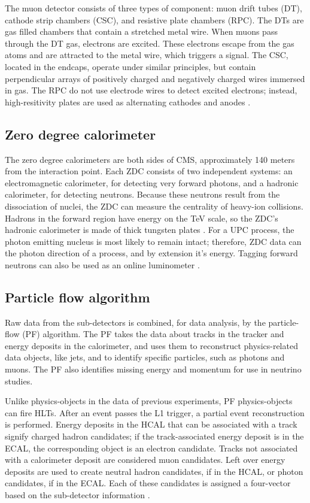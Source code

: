 The muon detector consists of three types of component: muon drift tubes (DT), cathode strip chambers (CSC), and resistive plate chambers (RPC). The DTs are gas filled chambers that contain a stretched metal wire. When muons pass through the DT gas, electrons are excited. These electrons escape from the gas atoms and are attracted to the metal wire, which triggers a signal. The CSC, located in the endcaps, operate under similar principles, but contain perpendicular arrays of positively charged and negatively charged wires immersed in gas. The RPC do not use electrode wires to detect excited electrons; instead, high-resitivity plates are used as alternating cathodes and anodes \cite{Albajar:2005wv}.

\subsection{Zero degree calorimeter}

The zero degree calorimeters are both sides of CMS, approximately 140 meters from the interaction point. Each ZDC consists of two independent systems: an electromagnetic calorimeter, for detecting very forward photons, and a hadronic calorimeter, for detecting neutrons. Because these neutrons result from the dissociation of nuclei, the ZDC can measure the centrality of heavy-ion collisions. Hadrons in the forward region have energy on the TeV scale, so the ZDC's hadronic calorimeter is made of thick tungsten plates \cite{Grachov:2006ke}. For a UPC process, the photon emitting nucleus is most likely to remain intact; therefore, ZDC data can the photon direction of a process, and by extension it's energy. Tagging forward neutrons can also be used as an online luminometer \cite{emPCite3}.

\subsection{Particle flow algorithm}

Raw data from the sub-detectors is combined, for data analysis, by the particle-flow (PF) algorithm. The PF takes the data about tracks in the tracker and energy deposits in the calorimeter, and uses them to reconstruct physics-related data objects, like jets, and to identify specific particles, such as photons and muons. The PF also identifies missing energy and momentum for use in neutrino studies. 

Unlike physics-objects in the data of previous experiments, PF physics-objects can fire HLTs. After an event passes the L1 trigger, a partial event reconstruction is performed. Energy deposits in the HCAL that can be associated with a track signify charged hadron candidates; if the track-associated energy deposit is in the ECAL, the corresponding object is an electron candidate. Tracks not associated with a calorimeter deposit are considered muon candidates. Left over energy deposits are used to create neutral hadron candidates, if in the HCAL, or photon candidates, if in the ECAL. Each of these candidates is assigned a four-vector based on the sub-detector information \cite{Beaudette:2014cea}. 

